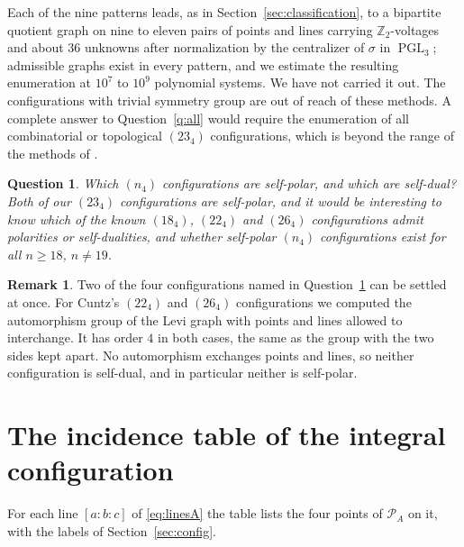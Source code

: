 \documentclass[11pt]{article}
\theoremstyle{plain}
\newtheorem{question}{Question}
\theoremstyle{definition}
\newtheorem*{remark}{Remark}
\newcommand{\ZZ}{\mathbb{Z}}
\newcommand{\cP}{\mathcal{P}}
\newcommand{\PGL}{\operatorname{PGL}}
\begin{document}
Each of the nine patterns leads, as in Section~\ref{sec:classification}, to a bipartite quotient graph on nine to eleven pairs of points and lines carrying $\ZZ_2$-voltages and about $36$ unknowns after normalization by the centralizer of $\sigma$ in $\PGL_3$; admissible graphs exist in every pattern, and we estimate the resulting enumeration at $10^7$ to $10^9$ polynomial systems.  We have not carried it out.  The configurations with trivial symmetry group are out of reach of these methods.  A complete answer to Question~\ref{q:all} would require the enumeration of all combinatorial or topological $(23_4)$ configurations, which is beyond the range of the methods of \cite{BP14,BP15}.

\begin{question}\label{q:selfpolar}
Which $(n_4)$ configurations are self-polar, and which are self-dual?  Both of our $(23_4)$ configurations are self-polar, and it would be interesting to know which of the known $(18_4)$, $(22_4)$ and $(26_4)$ configurations admit polarities or self-dualities, and whether self-polar $(n_4)$ configurations exist for all $n\ge18$, $n\ne19$.
\end{question}

\begin{remark}\label{rem:cuntzselfdual}
Two of the four configurations named in Question~\ref{q:selfpolar} can be settled at once.  For Cuntz's $(22_4)$ and $(26_4)$ configurations \cite{Cun18} we computed the automorphism group of the Levi graph with points and lines allowed to interchange.  It has order $4$ in both cases, the same as the group with the two sides kept apart.  No automorphism exchanges points and lines, so neither configuration is self-dual, and in particular neither is self-polar.
\end{remark}

\appendix
\renewcommand{\thesection}{Appendix \Alph{section}}
\renewcommand{\thesubsection}{\Alph{section}.\arabic{subsection}}
\section{The incidence table of the integral configuration}\label{app:incidenceA}

For each line $[a{:}b{:}c]$ of \eqref{eq:linesA} the table lists the four points of $\cP_A$ on it, with the labels of Section~\ref{sec:config}.
\end{document}
